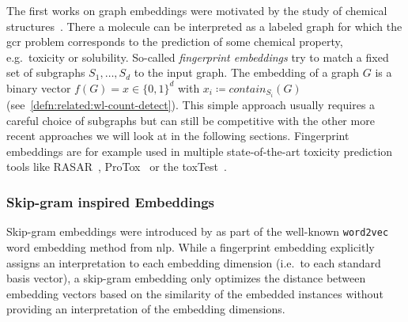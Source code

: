 The first works on graph embeddings were motivated by the study of chemical structures~\cite{Adamson1973}\cite{Willett1986}.
There a molecule can be interpreted as a labeled graph for which the \ac{gcr} problem corresponds to the prediction of some chemical property, e.g.\ toxicity or solubility.
So-called \textit{fingerprint embeddings} try to match a fixed set of subgraphs $S_1, \dots, S_d$ to the input graph.
The embedding of a graph $G$ is a binary vector $f(G) = x \in {\{0, 1\}}^d$ with $x_i \coloneqq \mathit{contain}_{S_i}(G)$ (see~\cref{defn:related:wl-count-detect}).
This simple approach usually requires a careful choice of subgraphs but can still be competitive with the other more recent approaches we will look at in the following sections.
Fingerprint embeddings are for example used in multiple state-of-the-art toxicity prediction tools like RASAR~\cite{Luechtefeld2018}\cite{ToxTrack}, ProTox~\cite{Drwal2014}\cite{Banerjee2018}\cite{ProTox} or the \ac{toxTest}~\cite{TEST}.

\subsubsection{Skip-gram inspired Embeddings}

Skip-gram embeddings were introduced by \citeauthor{Mikolov2013} as part of the well-known \texttt{word2vec}~\cite{Mikolov2013} word embedding method from \ac{nlp}.
While a fingerprint embedding explicitly assigns an interpretation to each embedding dimension (i.e.\ to each standard basis vector), a skip-gram embedding only optimizes the distance between embedding vectors based on the similarity of the embedded instances without providing an interpretation of the embedding dimensions.

